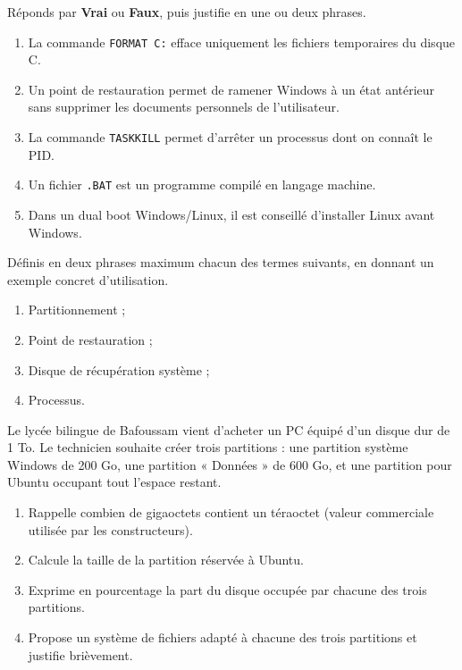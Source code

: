 \documentclass[11pt]{article}
\begin{document}
\begin{exercice}
Réponds par \textbf{Vrai} ou \textbf{Faux}, puis justifie en une ou deux phrases.
\begin{enumerate}
  \item La commande \texttt{FORMAT C:} efface uniquement les fichiers temporaires du disque C.
  \item Un point de restauration permet de ramener Windows à un état antérieur sans supprimer les documents personnels de l'utilisateur.
  \item La commande \texttt{TASKKILL} permet d'arrêter un processus dont on connaît le PID.
  \item Un fichier \texttt{.BAT} est un programme compilé en langage machine.
  \item Dans un dual boot Windows/Linux, il est conseillé d'installer Linux avant Windows.
\end{enumerate}
\end{exercice}

\begin{exercice}[Définitions]
Définis en deux phrases maximum chacun des termes suivants, en donnant un exemple concret d'utilisation.
\begin{enumerate}
  \item Partitionnement ;
  \item Point de restauration ;
  \item Disque de récupération système ;
  \item Processus.
\end{enumerate}
\end{exercice}

\begin{exercice}
Le lycée bilingue de Bafoussam vient d'acheter un PC équipé d'un disque dur de 1 To. Le technicien souhaite créer trois partitions : une partition système Windows de 200 Go, une partition « Données » de 600 Go, et une partition pour Ubuntu occupant tout l'espace restant.
\begin{enumerate}
  \item Rappelle combien de gigaoctets contient un téraoctet (valeur commerciale utilisée par les constructeurs).
  \item Calcule la taille de la partition réservée à Ubuntu.
  \item Exprime en pourcentage la part du disque occupée par chacune des trois partitions.
  \item Propose un système de fichiers adapté à chacune des trois partitions et justifie brièvement.
\end{enumerate}
\end{exercice}
\end{document}
